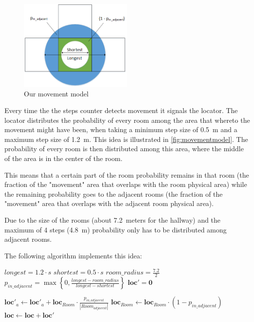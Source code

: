 \documentclass[a4paper,10pt,twoside]{IEEEtran}
\begin{document}
\begin{figure}
  \centering
    \includegraphics[width=0.5\textwidth]{movementmodel}
    \caption{Our movement model}
    \label{fig:movementmodel}
\end{figure}

Every time the the steps counter detects movement it signals the locator.
The locator distributes the probability of every room among the area that whereto the movement might have been, when taking a minimum step size of 0.5~m and a maximum step size of 1.2~m.
This idea is illustrated in \autoref{fig:movementmodel}.
The probability of every room is then distributed among this area, where the middle of the area is in the center of the room.

This means that a certain part of the room probability remains in that room (the fraction of the "movement"  area that overlaps with the room physical area) while the remaining probability goes to the adjacent rooms (the fraction of the "movement" area that overlaps with the adjacent room physical area).

Due to the size of the rooms (about 7.2~meters for the hallway) and the maximum of 4 steps (4.8~m) probability only has to be distributed among adjacent rooms.

The following algorithm implements this idea:
\begin{algorithmic}
	\State $longest = 1.2 \cdot s$
	\State $shortest = 0.5 \cdot s$
	\State $room\_radius = \frac{7.2}{2}$
	\State $p_{in\_adjacent} = \max\left\{0, \frac{longest - room\_radius}{longest-shortest}\right\}$
	\State $\mathbf{loc'} = \mathbf{0}$
		
			\State $\mathbf{loc'}_a \gets \mathbf{loc'}_{a} + \mathbf{loc}_{Room} \cdot \frac{p_{in\_adjacent}}{|Room_{adjacent}|} $
		\EndFor
		\State $\mathbf{loc}_{Room} \gets \mathbf{loc}_{Room} \cdot (1-p_{in\_adjacent})$
	\EndFor
	\State $\mathbf{loc} \gets \mathbf{loc} + \mathbf{loc'}$
\end{algorithmic}
\end{document}
